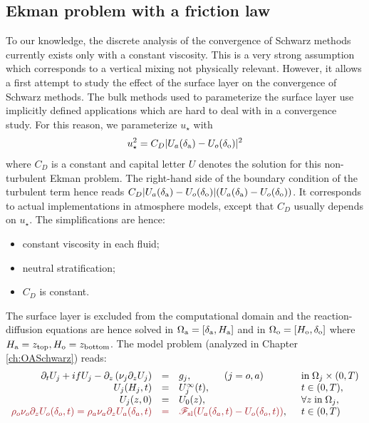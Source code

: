 \subsection{Ekman problem with a friction law}
\label{sec:airseaSCM_hierarchy_Ekman}
To our knowledge, the discrete analysis of the convergence of Schwarz
methods currently exists only with a constant viscosity.
This is a very strong assumption
which corresponds to a vertical mixing not physically relevant.
However, it allows a first attempt to study the
effect of the surface layer on the convergence of Schwarz methods.
The bulk methods used to parameterize the surface layer use
implicitly defined applications which are hard to deal with
in a convergence study. For this reason, we parameterize
$u_\star$ with
\begin{equation}
	{u_\star^2} = C_D {|U_a(\delta_{\rm a}) - U_o(\delta_{\rm o})|^2}
\end{equation}
where $C_D$ is a constant and capital letter $U$ denotes
the solution for this non-turbulent Ekman problem.
The right-hand side of the boundary condition of the
turbulent term hence reads
$C_D|U_a(\delta_{\rm a}) - U_o(\delta_{\rm o})|
(U_a(\delta_{\rm a}) - U_o(\delta_{\rm o}))$.
It corresponds to actual implementations
in atmosphere models, except that $C_D$ usually depends on $u_\star$.
The simplifications are hence:
\begin{itemize}
	\item constant viscosity in each fluid;
	\item neutral stratification;
	\item $C_D$ is constant.
\end{itemize}
The surface layer is excluded from the computational domain and
the reaction-diffusion equations are hence solved in
$\Omega_{\rm a} = [\delta_{\rm a},H_{\rm a}]$ and
in $\Omega_{\rm o} = [H_{\rm o},\delta_{\rm o}]$ where
$H_{\rm a}=z_{\rm top}, H_{\rm o}=z_{\rm bottom}$.
The model problem (analyzed in Chapter \ref{ch:OASchwarz}) reads:
\begin{equation}
\label{eq:cplProblem}
\begin{array}{rcll}
\partial_t U_j + i f U_j -
	\partial_z \left( \nu_j \partial_z U_j \right) &=& g_j,
~~~~~~~~~~ (j=o,a)
& \mbox{in}\;\Omega_j \times (0,T)\\
U_j(H_j,t) &=& U_j^\infty(t),  & t \in (0,T), \\ 
U_j(z,0) &=& U_0(z), & \forall z \; \mbox{in}\; \Omega_j, \\
	\emphase{\rho_o \nu_o \partial_z U_o(\delta_o,t) = \rho_a \nu_a \partial_z U_a(\delta_a,t)}
	&\emphase{=}&
	\emphase{{\cal F}_{\rm sl}( U_a(\delta_a,t)-U_o(\delta_o,t) )}, \;\; & t \in (0,T)
\end{array}
\end{equation}

